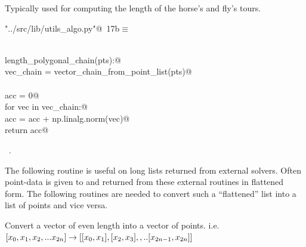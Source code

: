 \documentclass[11.5pt]{report}
\begin{document}
Typically used for computing the length of the horse's and fly's tours. 

\begin{flushleft} \small\label{scrap12}\raggedright\small
{} \verb@"../src/lib/utils_algo.py"@\nobreak\ {\footnotesize {17b}}$\equiv$
\vspace{-1ex}
\begin{list}{}{} \item
\mbox{}\verb@@\\
\mbox{}\verb@def length_polygonal_chain(pts):@\\
\mbox{}\verb@    vec_chain = vector_chain_from_point_list(pts)@\\
\mbox{}\verb@@\\
\mbox{}\verb@    acc = 0@\\
\mbox{}\verb@    for vec in vec_chain:@\\
\mbox{}\verb@        acc = acc + np.linalg.norm(vec)@\\
\mbox{}\verb@    return acc@\\
\mbox{}\verb@@{\NWsep}
\end{list}
\vspace{-1.5ex}
\footnotesize
\begin{list}{}{\setlength{\itemsep}{-\parsep}\setlength{\itemindent}{-\leftmargin}}
\item \NWtxtFileDefBy\ .

\item{}
\end{list}
\vspace{4ex}
\end{flushleft}
\newchunk The following routine is useful on long lists returned from external solvers. 
Often point-data is given to and returned from these external routines in flattened
form. The following routines are needed to convert such a ``flattened'' list into 
a list of points and vice versa. 

Convert a vector of even length into a vector of points. i.e. 
$[x_0,x_1,x_2,...x_{2n}] \rightarrow [[x_0,x_1],[x_2,x_3],,..[x_{2n-1},x_{2n}]]$
\end{document}
